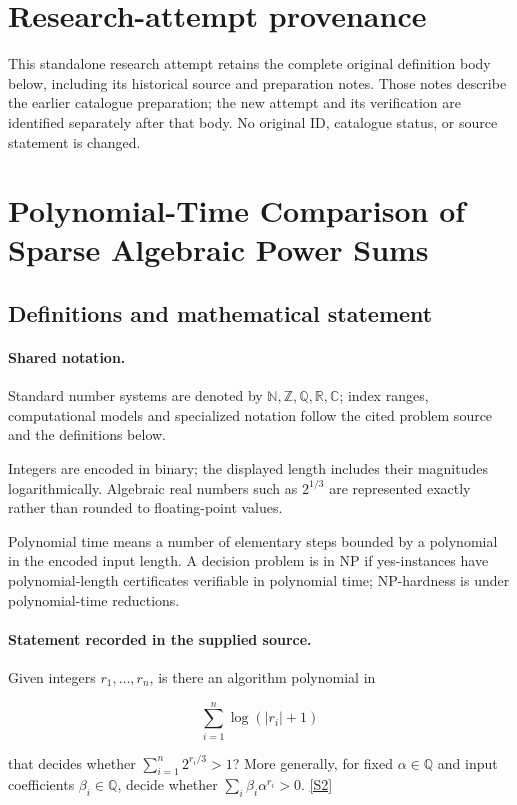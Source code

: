 \documentclass[11pt]{article}
\begin{document}
\section*{Research-attempt provenance}
This standalone research attempt retains the complete original definition body below,
including its historical source and preparation notes. Those notes describe the
earlier catalogue preparation; the new attempt and its verification are identified
separately after that body. No original ID, catalogue status, or source statement is changed.

\section{Polynomial-Time Comparison of Sparse Algebraic Power Sums}\label{statement}

\subsection{Definitions and mathematical statement}

\paragraph{Shared notation.}Standard number systems are denoted by $\mathbb N,\mathbb Z,\mathbb Q,\mathbb R,\mathbb C$; index ranges, computational models and specialized notation follow the cited problem source and the definitions below.


Integers are encoded in binary; the displayed length includes their magnitudes logarithmically. Algebraic real numbers such as $2^{1/3}$ are represented exactly rather than rounded to floating-point values.

Polynomial time means a number of elementary steps bounded by a polynomial in the encoded input length. A decision problem is in $\mathrm{NP}$ if yes-instances have polynomial-length certificates verifiable in polynomial time; NP-hardness is under polynomial-time reductions.
\paragraph{Statement recorded in the supplied source.}
Given integers $r_1,\ldots,r_n$, is there an algorithm polynomial in

$$\sum_{i=1}^n\log(\lvert r_i\rvert+1)$$

that decides whether $\sum_{i=1}^n2^{r_i/3}>1$? More generally, for fixed $\alpha\in\mathbb Q$ and input coefficients $\beta_i\in\mathbb Q$, decide whether $\sum_i\beta_i\alpha^{r_i}>0$. \href{https://doi.org/10.4171/owr/2018/50}{[S2]}
\end{document}
